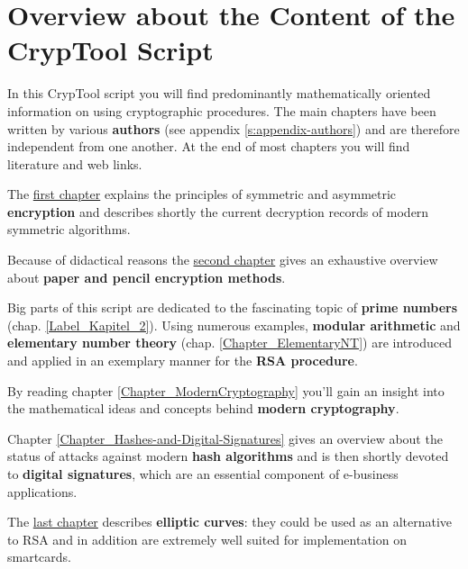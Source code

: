 
\section*{Overview about the Content of the CrypTool Script}  

\parskip 4pt
{
\noindent In this CrypTool script you will find predominantly
mathematically oriented information on using cryptographic procedures.
The main chapters have been written by various
{\bf authors} (see appendix \ref{s:appendix-authors})
and are therefore independent from one another. At the end of most chapters
you will find literature and web links.

The \hyperlink{Kapitel_1}{first chapter} explains the principles of symmetric
and asymmetric {\bf encryption} and describes shortly the current decryption
records of modern symmetric algorithms.

Because of didactical reasons the \hyperlink{Kapitel_PaperandPencil}
{second chapter} gives an exhaustive overview
about {\bf paper and pencil encryption methods}.

Big parts of this script are dedicated to the fascinating topic of 
{\bf prime numbers} (chap. \ref{Label_Kapitel_2}).
Using numerous examples,
{\bf modular arithmetic} and 
{\bf elementary number theory} (chap. \ref{Chapter_ElementaryNT})
are introduced and applied in an exemplary manner for the {\bf RSA procedure}.

By reading chapter \ref{Chapter_ModernCryptography}
you'll gain an insight into the mathematical ideas and concepts behind 
{\bf modern cryptography}.

Chapter \ref{Chapter_Hashes-and-Digital-Signatures} gives
an overview about the status of attacks against modern {\bf hash algorithms}
and is then shortly devoted to {\bf digital signatures}, 
which are an essential component of e-business applications.

The \hyperlink{ellcurve}{last chapter} describes {\bf elliptic curves}:
they could be used as an alternative to RSA and in addition are extremely
well suited for implementation on smartcards.

}
